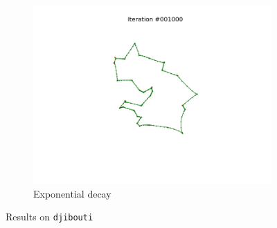 \documentclass[11pt]{article}
\begin{document}
\begin{figure}
\begin{subfigure}{.33\textwidth}
  \includegraphics[trim={6cm 2cm 6cm 2cm}, clip=true,width=\linewidth]{d_e.png}
  \caption{Exponential decay}
\end{subfigure}
\caption{Results on \texttt{djibouti}}
\label{fig:djibouti}

\end{figure}
\end{document}
